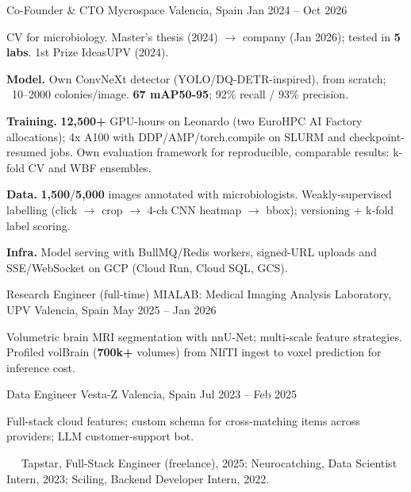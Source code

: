 \begin{cventries}
\cvkeep
\cventry
    {Co-Founder \& CTO}
    {Mycrospace}
    {Valencia, Spain}
    {Jan 2024 – Oct 2026}
    {
\begin{cvitems}
\item {CV for microbiology. Master's thesis (2024) $\rightarrow$ company (Jan 2026); tested in \textbf{5 labs}. 1st Prize IdeasUPV (2024).}
\item {\textbf{Model.} Own ConvNeXt detector (YOLO/DQ-DETR-inspired), from scratch; ~10–2000 colonies/image. \textbf{67 mAP50-95}; 92\% recall / 93\% precision.}
\item {\textbf{Training.} \textbf{12,500+} GPU-hours on Leonardo (two EuroHPC AI Factory allocations); 4x A100 with DDP/AMP/torch.compile on SLURM and checkpoint-resumed jobs. Own evaluation framework for reproducible, comparable results: k-fold CV and WBF ensembles.}
\item {\textbf{Data.} \textbf{1,500}/\textbf{5,000} images annotated with microbiologists. Weakly-supervised labelling (click $\rightarrow$ crop $\rightarrow$ 4-ch CNN heatmap $\rightarrow$ bbox); versioning + k-fold label scoring.}
\item {\textbf{Infra.} Model serving with BullMQ/Redis workers, signed-URL uploads and SSE/WebSocket on GCP (Cloud Run, Cloud SQL, GCS).}
\end{cvitems}
    }
\cvkeep
\cventry
    {Research Engineer (full-time)}
    {MIALAB: Medical Imaging Analysis Laboratory, UPV}
    {Valencia, Spain}
    {May 2025 – Jan 2026}
    {
\begin{cvitems}
\item {Volumetric brain MRI segmentation with nnU-Net; multi-scale feature strategies. Profiled volBrain (\textbf{700k+} volumes) from NIfTI ingest to voxel prediction for inference cost.}
\end{cvitems}
    }
\cvkeep
\cventry
    {Data Engineer}
    {Vesta-Z}
    {Valencia, Spain}
    {Jul 2023 – Feb 2025}
    {
\begin{cvitems}
\item {Full-stack cloud features; custom schema for cross-matching items across providers; LLM customer-support bot.}
\end{cvitems}
    }
\end{cventries}
\vspace{0.4mm}
~~{\fontsize{8pt}{1em}\bodyfontlight\color{text} Tapstar, Full-Stack Engineer (freelance), 2025; Neurocatching, Data Scientist Intern, 2023; Sciling, Backend Developer Intern, 2022.}\par
